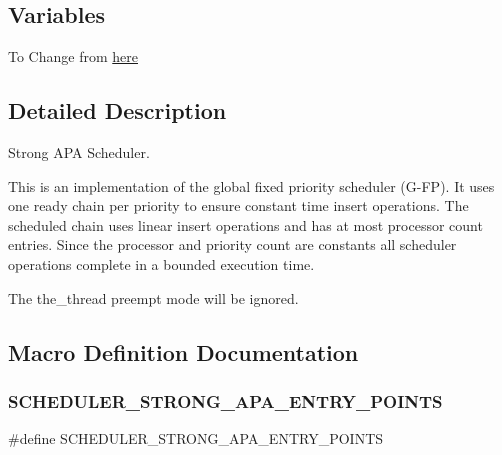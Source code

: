 \subsection*{Variables}
\begin{DoxyCompactItemize}
\item 
To Change from \hyperlink{group__RTEMSScoreSchedulerStrongAPA_ga2642e9c7c12fd0dfb1a66f42949a95c4}{here}
\end{DoxyCompactItemize}


\subsection{Detailed Description}
Strong A\+PA Scheduler. 

This is an implementation of the global fixed priority scheduler (G-\/\+FP). It uses one ready chain per priority to ensure constant time insert operations. The scheduled chain uses linear insert operations and has at most processor count entries. Since the processor and priority count are constants all scheduler operations complete in a bounded execution time.

The the\+\_\+thread preempt mode will be ignored. 

\subsection{Macro Definition Documentation}
\mbox{\label{group__RTEMSScoreSchedulerStrongAPA_ga98b37281082c0be47dc489eed554c5cc}} 
\subsubsection{\texorpdfstring{S\+C\+H\+E\+D\+U\+L\+E\+R\+\_\+\+S\+T\+R\+O\+N\+G\+\_\+\+A\+P\+A\+\_\+\+E\+N\+T\+R\+Y\+\_\+\+P\+O\+I\+N\+TS}{SCHEDULER\_STRONG\_APA\_ENTRY\_POINTS}}
{\footnotesize\ttfamily \#define S\+C\+H\+E\+D\+U\+L\+E\+R\+\_\+\+S\+T\+R\+O\+N\+G\+\_\+\+A\+P\+A\+\_\+\+E\+N\+T\+R\+Y\+\_\+\+P\+O\+I\+N\+TS}

